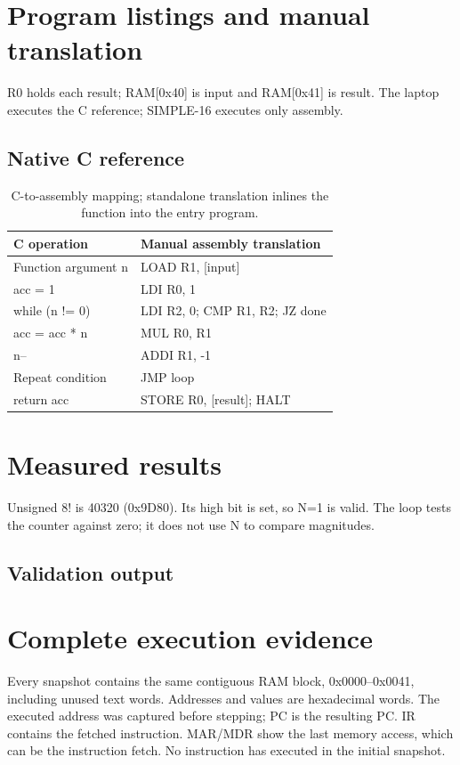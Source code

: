 \documentclass[10pt]{article}
\begin{document}
\section*{Program listings and manual translation}
R0 holds each result; RAM[0x40] is input and RAM[0x41] is result.
The laptop executes the C reference; SIMPLE-16 executes only assembly.
\subsection*{Native C reference}
\begin{table}[h]\centering
\begin{tabular}{ll}\toprule
C operation & Manual assembly translation\\\midrule
Function argument n & LOAD R1, [input]\\
acc = 1 & LDI R0, 1\\
while (n != 0) & LDI R2, 0; CMP R1, R2; JZ done\\
acc = acc * n & MUL R0, R1\\
n-- & ADDI R1, -1\\
Repeat condition & JMP loop\\
return acc & STORE R0, [result]; HALT\\\bottomrule
\end{tabular}\caption{C-to-assembly mapping; standalone translation inlines the function into the entry program.}
\end{table}
\clearpage

\section*{Measured results}

Unsigned 8! is 40320 (0x9D80). Its high bit is set, so N=1 is valid.
The loop tests the counter against zero; it does not use N to compare magnitudes.
\clearpage
\subsection*{Validation output}
\section*{Complete execution evidence}
Every snapshot contains the same contiguous RAM block, 0x0000--0x0041,
including unused text words. Addresses and values are hexadecimal words.
The executed address was captured before stepping; PC is the resulting PC.
IR contains the fetched instruction. MAR/MDR show the last memory access,
which can be the instruction fetch. No instruction has executed in the initial snapshot.

\clearpage
\end{document}
